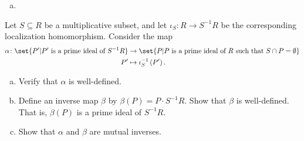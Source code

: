 \documentclass[10pt]{mypackage}
\renewcommand*{\mathbb}[1]{\varmathbb{#1}}
\begin{document}
\begin{solution}
\begin{enumerate}[(a)]
\begin{center}
      \end{center}
    \item 
  \end{enumerate}
\end{solution}
\begin{problem}[Problem 7]
  Let $S\subseteq R$ be a multiplicative subset, and let $\iota_S\colon R\rightarrow S^{-1}R$ be the corresponding localization homomorphism. Consider the map
  \begin{align*}
    \alpha\colon \set{P'| P'\text{ is a prime ideal of }S^{-1}R}&\rightarrow \set{P | P\text{ is a prime ideal of }R\text{ such that }S\cap P = \emptyset}\\
    P'&\mapsto \iota_S^{-1}\left( P' \right).
  \end{align*}
  \begin{enumerate}[(a)]
    \item Verify that $\alpha$ is well-defined.
    \item Define an inverse map $\beta$ by $\beta(P) = P\cdot S^{-1}R$. Show that $\beta$ is well-defined. That is, $\beta(P)$ is a prime ideal of $S^{-1}R$.
    \item Show that $\alpha$ and $\beta$ are mutual inverses.
  \end{enumerate}
\end{problem}
\end{document}
